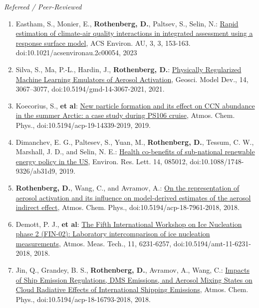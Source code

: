 \documentclass[11pt,letterpaper]{article}
\begin{document}
 \bigskip
 \emph{Refereed / Peer-Reviewed}
 \medskip
 \begin{enumerate}[itemindent=-10pt]

 \item Eastham, S., Monier, E., \textbf{Rothenberg, D.}, Paltsev, S., Selin, N.: \href{https://pubs.acs.org/doi/10.1021/acsenvironau.2c00054}{Rapid estimation of climate-air quality interactions in integrated assessment using a response surface model}, ACS Environ. AU, 3, 3, 153-163. doi:10.1021/acsenvironau.2c00054, 2023

 \item Silva, S., Ma, P.-L., Hardin, J., \textbf{Rothenberg, D.}: \href{https://doi.org/10.5194/gmd-14-3067-2021}{Physically Regularized Machine Learning Emulators of Aerosol Activation}, Geosci. Model Dev., 14, 3067–3077, doi:10.5194/gmd-14-3067-2021, 2021.

 \item Koecorius, S., \textbf{et al}: \href{https://doi.org/10.5194/acp-19-14339-2019}{New particle formation and its effect on CCN abundance in the summer Arctic: a case study during PS106 cruise}, Atmos. Chem. Phys., doi:10.5194/acp-19-14339-2019, 2019.

 \item Dimanchev, E. G., Paltesev, S., Yuan, M., \textbf{Rothenberg, D.}, Tessum, C. W., Marshall, J. D., and Selin, N. E.: \href{https://doi.org/10.1088/1748-9326/ab31d9}{Health co-benefits of sub-national renewable energy policy in the US}, Environ. Res. Lett. 14, 085012, doi:10.1088/1748-9326/ab31d9, 2019.

 \item \textbf{Rothenberg, D.}, Wang, C., and Avramov, A.: \href{http://doi.org/10.5194/acp-18-7961-2018}{On the representation of aerosol activation and its influence on model-derived estimates of the aerosol indirect effect}, Atmos. Chem. Phys., doi:10.5194/acp-18-7961-2018, 2018.

 \item Demott, P. J., \textbf{et al}: \href{https://doi.org/10.5194/amt-11-6231-2018}{The Fifth International Workshop on Ice Nucleation phase 2 (FIN-02): Laboratory intercomparison of ice nucleation measurements}, Atmos. Meas. Tech., 11, 6231-6257, doi:10.5194/amt-11-6231-2018, 2018.

 \item Jin, Q., Grandey, B. S., \textbf{Rothenberg, D.}, Avramov, A., Wang, C.: \href{https://doi.org/10.5194/acp-18-16793-2018}{Impacts of Ship Emission Regulations, DMS Emissions, and Aerosol Mixing States on Cloud Radiative Effects of International Shipping Emissions}, Atmos. Chem. Phys., doi:10.5194/acp-18-16793-2018, 2018.


\end{enumerate}
\end{document}
